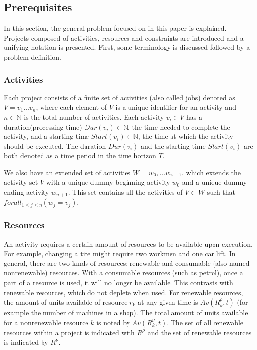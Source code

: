\documentclass{article}
\newcommand{\renres}[0]{R^\rho} %
\newcommand{\conres}[0]{R^\nu} %
\newcommand{\av}[1]{\textit{Av}(#1)} %
\newcommand{\dur}[1]{\textit{Dur}(#1)} %
\newcommand{\start}[1]{\textit{Start}(#1)} %
\begin{document}
\subsection{Prerequisites}
In this section, the general problem focused on in this paper is explained.
Projects composed of activities, resources and constraints are introduced and a unifying notation is presented.
First, some terminology is discussed followed by a problem definition.

\subsubsection{Activities}
Each project consists of a finite set of activities (also called jobs) denoted as $V = v_1 \ldots v_n$, where each element of $V$ is a unique identifier for an activity and $n \in \mathbb{N}$ is the total number of activities.
Each activity $v_i \in V$ has a duration(processing time) $\dur{v_i} \in \mathbb{N}$, the time needed to complete the activity, and a starting time $\start{v_i} \in \mathbb{N}$, the time at which the activity should be executed. The duration $\dur{v_i}$ and the starting time $\start{v_i}$ are both denoted as a time period in the time horizon $T$.

We also have an extended set of activities $W = w_0, \ldots w_{n+1}$, which extends the activity set $V$ with a unique dummy beginning activity $w_0$ and a unique dummy ending activity $w_{n+1}$. This set contains all the activities of $V \subset W$ such that $forall_{1 \leq j \leq n}(w_j = v_j)$.

\subsubsection{Resources}
An activity requires a certain amount of resources to be available upon execution.
For example, changing a tire might require two workmen and one car lift.
In general, there are two kinds of resources: renewable and consumable (also named nonrenewable) resources.
With a consumable resources (such as petrol), once a part of a resource is used, it will no longer be available.
This contrasts with renewable resources, which do not deplete when used.
For renewable resources, the amount of units available of resource $r_k$ at any given time is $\av{\renres_k, t}$ (for example the number of machines in a shop).
The total amount of units available for a nonrenewable resource $k$ is noted by $\av{\conres_k, t}$.
The set of all renewable resources within a project is indicated with $\renres$ and the set of renewable resources is indicated by $\conres$. 
\end{document}
